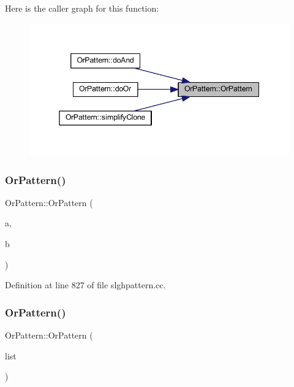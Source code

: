 Here is the caller graph for this function\+:
\nopagebreak
\begin{figure}[H]
\begin{center}
\leavevmode
\includegraphics[width=345pt]{class_or_pattern_adfb8feafd5e28e0699e2279b02f79112_icgraph}
\end{center}
\end{figure}
\mbox{\label{class_or_pattern_a47acd6bf2f0acc89d62069ef90b41f39}} 
\subsubsection{\texorpdfstring{OrPattern()}{OrPattern()}\hspace{0.1cm}{\footnotesize\ttfamily [2/3]}}
{\footnotesize\ttfamily Or\+Pattern\+::\+Or\+Pattern (\begin{DoxyParamCaption}\item[{\mbox{\hyperlink{class_disjoint_pattern}{Disjoint\+Pattern}} $\ast$}]{a,  }\item[{\mbox{\hyperlink{class_disjoint_pattern}{Disjoint\+Pattern}} $\ast$}]{b }\end{DoxyParamCaption})}



Definition at line 827 of file slghpattern.\+cc.

\mbox{\label{class_or_pattern_a8c14e073b96dbe15750186b3a37a17c2}} 
\subsubsection{\texorpdfstring{OrPattern()}{OrPattern()}\hspace{0.1cm}{\footnotesize\ttfamily [3/3]}}
{\footnotesize\ttfamily Or\+Pattern\+::\+Or\+Pattern (\begin{DoxyParamCaption}\item[{const vector$<$ \mbox{\hyperlink{class_disjoint_pattern}{Disjoint\+Pattern}} $\ast$ $>$ \&}]{list }\end{DoxyParamCaption})}



